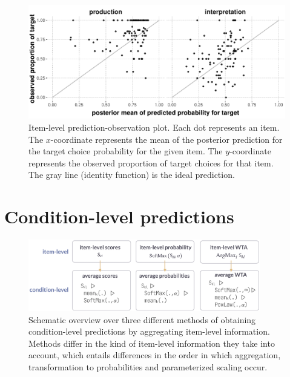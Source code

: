 \documentclass[fleqn]{article}
\begin{document}
\begin{figure}[t]
  \centering

  \includegraphics[width = 0.9\linewidth]{00-pics/GPT-item-combined-obs-pred.pdf}

  \caption{
    Item-level prediction-observation plot.
    Each dot represents an item.
    The $x$-coordinate represents the mean of the posterior prediction for the target choice probability for the given item.
    The $y$-coordinate represents the observed proportion of target choices for that item.
    The gray line (identity function) is the ideal prediction.
  }
  \label{fig:item-level-obs-pred}
\end{figure}


\section{Condition-level predictions}
\label{llm-predictions-for-reference-games}


\begin{figure}
  \centering
  \includegraphics[width=0.9\textwidth]{00-pics/measures-overview.png}
  \caption{
    Schematic overview over three different methods of obtaining condition-level predictions by aggregating item-level information.
    Methods differ in the kind of item-level information they take into account, which entails differences in the order in which aggregation, transformation to probabilities and parameterized scaling occur.
  }
  \label{fig:measures-overview}
\end{figure}
\end{document}
